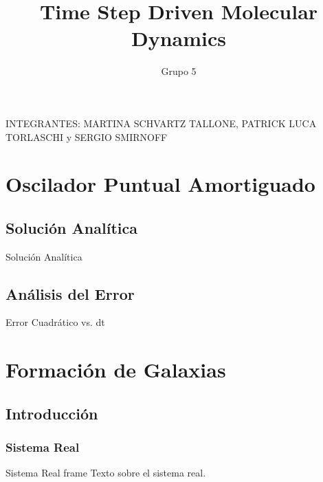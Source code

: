 \documentclass{beamer}
\title{Time Step Driven Molecular Dynamics}
\author{Grupo 5}
\institute{ITBA}
\date{} %
\begin{document}
  \begin{frame}
    \titlepage
    \begin{center}
      \small INTEGRANTES: MARTINA SCHVARTZ TALLONE, PATRICK LUCA TORLASCHI y SERGIO SMIRNOFF
    \end{center}
  \end{frame}

%

  \section{Oscilador Puntual Amortiguado}
  \subsection{Solución Analítica}
  \begin{frame}{Solución Analítica}

  \end{frame}
  \subsection{Análisis del Error}
  \begin{frame}{Error Cuadrático vs. dt}

  \end{frame}



  \section{Formación de Galaxias}

  \subsection{Introducción}
  \subsubsection{Sistema Real}
  \begin{frame}{Sistema Real frame}
    Texto sobre el sistema real.
  \end{frame}
\end{document}
